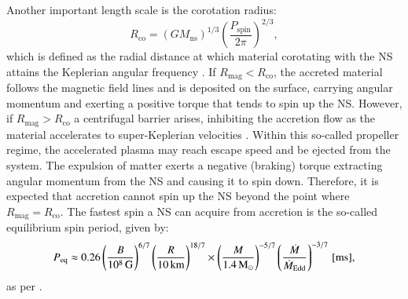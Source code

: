 \documentclass[main.tex]{subfiles}
\begin{document}
    Another important length scale is the corotation radius:
    \begin{equation}
        \label{eq:rcor}
        R_\mathrm{co} = (G M_\mathrm{ns})^{1/3}\left(\frac{P_\mathrm{spin}}{2\pi}\right)^{2/3},
    \end{equation}
    which is defined as the radial distance at which material corotating with the NS attains the  
    Keplerian angular frequency \citep[e.g.,][]{1996ApJ...457L..31C, 2017ApJ...835....4B, 
    Bhattacharyya:mdpi23}. If $R_\mathrm{mag} < R_\mathrm{co}$, the accreted material follows the magnetic field lines and is deposited on the surface, carrying angular momentum and exerting a positive torque that tends to spin up the NS. However, if $R_\mathrm{mag} > R_\mathrm{co}$ a centrifugal barrier arises, inhibiting the accretion flow as the material accelerates to super-Keplerian velocities \citep[e.g.,][and references therein]{2017ApJ...835....4B, Bhattacharyya:mdpi23}. Within this so-called propeller regime, the accelerated plasma may reach escape speed and be ejected from the system. The expulsion of matter exerts a negative (braking) torque extracting angular momentum from the NS and causing it to spin down. Therefore, it is expected that accretion cannot spin up the NS beyond the point where $R_\mathrm{mag} = R_\mathrm{co}$. The fastest spin a NS can acquire from accretion is the so-called equilibrium spin period, given by:
    \begin{equation}
        \label{eq:p_eq}
        P_\mathrm{eq} \approx 0.26 \left(\frac{B}{10^8\,\mathrm{G}}\right)^{6/7} \left(\frac{R}{10\,\mathrm{km}}\right)^{18/7} \times \left(\frac{M}{1.4\mathrm{\,M_\odot}}\right)^{-5/7} \left(\frac{\dot{M}}{\dot{M}_\mathrm{Edd}}\right)^{-3/7}\,\mathrm{[ms],}
    \end{equation}
    as per \citet{10.1111/j.1365-2966.2005.09167.x}.
    
\end{document}
